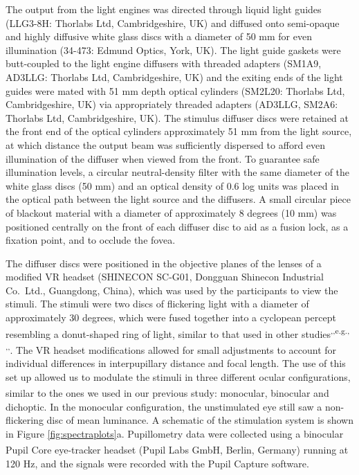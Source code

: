 \documentclass[
]{article}
\begin{document}
The output from the light engines was directed through liquid light guides (LLG3-8H: Thorlabs Ltd, Cambridgeshire, UK) and diffused onto semi-opaque and highly diffusive white glass discs with a diameter of 50 mm for even illumination (34-473: Edmund Optics, York, UK). The light guide gaskets were butt-coupled to the light engine diffusers with threaded adapters (SM1A9, AD3LLG: Thorlabs Ltd, Cambridgeshire, UK) and the exiting ends of the light guides were mated with 51 mm depth optical cylinders (SM2L20: Thorlabs Ltd, Cambridgeshire, UK) via appropriately threaded adapters (AD3LLG, SM2A6: Thorlabs Ltd, Cambridgeshire, UK). The stimulus diffuser discs were retained at the front end of the optical cylinders approximately 51 mm from the light source, at which distance the output beam was sufficiently dispersed to afford even illumination of the diffuser when viewed from the front. To guarantee safe illumination levels, a circular neutral-density filter with the same diameter of the white glass discs (50 mm) and an optical density of 0.6 log units was placed in the optical path between the light source and the diffusers. A small circular piece of blackout material with a diameter of approximately 8 degrees (10 mm) was positioned centrally on the front of each diffuser disc to aid as a fusion lock, as a fixation point, and to occlude the fovea.

The diffuser discs were positioned in the objective planes of the lenses of a modified VR headset (SHINECON SC-G01, Dongguan Shinecon Industrial Co.~Ltd., Guangdong, China), which was used by the participants to view the stimuli. The stimuli were two discs of flickering light with a diameter of approximately 30 degrees, which were fused together into a cyclopean percept resembling a donut-shaped ring of light, similar to that used in other studies\textsuperscript{,,e.g., ,,}. The VR headset modifications allowed for small adjustments to account for individual differences in interpupillary distance and focal length. The use of this set up allowed us to modulate the stimuli in three different ocular configurations, similar to the ones we used in our previous study\textsuperscript{}: monocular, binocular and dichoptic. In the monocular configuration, the unstimulated eye still saw a non-flickering disc of mean luminance. A schematic of the stimulation system is shown in Figure \ref{fig:spectraplots}a. Pupillometry data were collected using a binocular Pupil Core eye-tracker headset (Pupil Labs GmbH, Berlin, Germany)\textsuperscript{} running at 120 Hz, and the signals were recorded with the Pupil Capture software.
\end{document}

